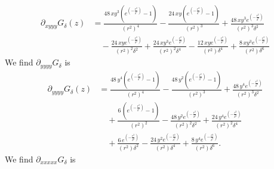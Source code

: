 \documentclass[12pt]{amsart}
\begin{document}
\begin{align*}
  \partial_{xyyy}G_\delta(z) &= \frac{48 \, x y^{3} {\left(e^{\left(-\frac{r^{2}}{\delta^{2}}\right)} - 1\right)}}{{\left(r^{2}\right)}^{4}} 
  -\frac{24 \, x y {\left(e^{\left(-\frac{r^{2}}{\delta^{2}}\right)} -1\right)}}{{\left(r^{2}\right)}^{3}} 
  + \frac{48 \, x y^{3} e^{\left(-\frac{r^{2}}{\delta^{2}}\right)}}{{\left(r^{2}\right)}^{3} \delta^{2}} \\
  &\quad - \frac{24 \, x y e^{\left(-\frac{r^{2}}{\delta^{2}}\right)}}{{\left(r^{2}\right)}^{2} \delta^{2}} 
  +\frac{24 \, x y^{3} e^{\left(-\frac{r^{2}}{\delta^{2}}\right)}}{{\left(r^{2}\right)}^{2} \delta^{4}} 
  -\frac{12 \, x y e^{\left(-\frac{r^{2}}{\delta^{2}}\right)}}{{\left(r^{2}\right)} \delta^{4}} 
  + \frac{8 \,x y^{3} e^{\left(-\frac{r^{2}}{\delta^{2}}\right)}}{{\left(r^{2}\right)} \delta^{6}}
\end{align*}
We find $\partial_{yyyy}G_\delta$ is
\begin{align*}
  \partial_{yyyy}G_\delta(z) &= \frac{48 \, y^{4} {\left(e^{\left(-\frac{r^{2}}{\delta^{2}}\right)} - 1\right)}}{{\left(r^{2}\right)}^{4}} 
  - \frac{48 \, y^{2} {\left(e^{\left(-\frac{r^{2}}{\delta^{2}}\right)} - 1\right)}}{{\left(r^{2}\right)}^{3}} 
  + \frac{48 \, y^{4} e^{\left(-\frac{r^{2}}{\delta^{2}}\right)}}{{\left(r^{2}\right)}^{3} \delta^{2}} \\
  &\quad + \frac{6 \, {\left(e^{\left(-\frac{r^{2}}{\delta^{2}}\right)} - 1\right)}}{{\left(r^{2}\right)}^{2}} 
  - \frac{48 \, y^{2} e^{\left(-\frac{r^{2}}{\delta^{2}}\right)}}{{\left(r^{2}\right)}^{2} \delta^{2}} 
  + \frac{24 \, y^{4} e^{\left(-\frac{r^{2}}{\delta^{2}}\right)}}{{\left(r^{2}\right)}^{2} \delta^{4}} \\
  &\quad + \frac{6 \, e^{\left(-\frac{r^{2}}{\delta^{2}}\right)}}{{\left(r^{2}\right)} \delta^{2}} 
  - \frac{24 \, y^{2} e^{\left(-\frac{r^{2}}{\delta^{2}}\right)}}{{\left(r^{2}\right)} \delta^{4}} 
  + \frac{8 \, y^{4} e^{\left(-\frac{r^{2}}{\delta^{2}}\right)}}{{\left(r^{2}\right)} \delta^{6}}.
\end{align*}
We find $\partial_{xxxxx}G_\delta$ is
\end{document}
